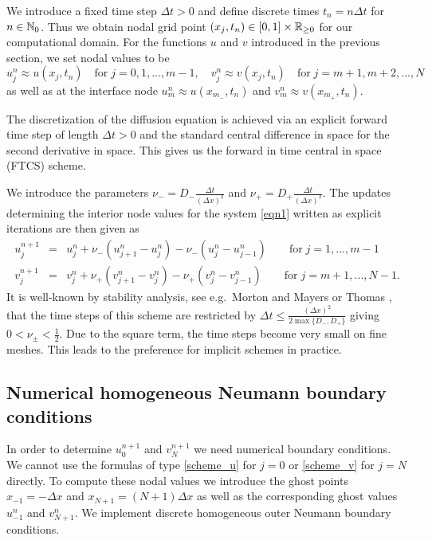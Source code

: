 We introduce a fixed time step $\Delta t>0$ and define discrete times $t_n=n\Delta t$ for $n\in\mathbb{N}_0$.
Thus we obtain nodal grid point $(x_j,t_n)\in [0,1]\times\mathbb{R}_{\ge 0}$ for our computational domain.
For the functions $u$ and $v$ introduced in the previous section, we set nodal values to be
% 
$$%
u_{j}^n \approx u(x_{j},t_n)\quad \text{for}\; j=0,1,...,m-1,
\quad v_{j}^n\approx v(x_{j},t_n) \quad\text{for}\;j=m+1,m+2,...,N
$$%
%
as well as at the interface node $u_{m}^n\approx u(x_{m_{-}},t_n)$ and 
$v_{m}^n\approx v(x_{m_{+}},t_n)$. 

The discretization of the diffusion equation is achieved via an explicit forward time step of length $\Delta t>0$ and 
the standard central difference in space for the second derivative in space. This gives us the forward in time central in space
(FTCS) scheme. 

We introduce the parameters $\nu_-=D_{-}\frac{\Delta t}{(\Delta x)^2}$ and $\nu_+=D_{+}\frac{\Delta t}{(\Delta x)^2}$.
The updates determining the interior node values for the system \eqref{eqn1} written as explicit iterations
are then given as
%
\begin{eqnarray}
\label{scheme_u}
u^{n+1}_{j}&=&u_j^n +\nu_- (u^n_{j+1}-u_{j}^{n})-\nu_-(u_j^n- u_{j-1}^{n}) \qquad\mbox{for}\;j=1,...,m-1\\
\label{scheme_v}
v^{n+1}_{j}&=&v_j^n +\nu_+ (v^n_{j+1}-v_{j}^{n}) -\nu_+ (v_j^n-v_{j-1}^{n}) \qquad\mbox{for}\;j=m+1,...,N-1.
\end{eqnarray}
%
It is well-known by 
stability analysis, see e.g.\ Morton and Mayers \cite{bMOMA} or Thomas \cite{bTHO}, 
that the time steps of this scheme are restricted by 
$\Delta t\le \frac{(\Delta x)^2}{2 \max\{D_{-},D_{+}\}}$ giving $0<\nu_\pm< \frac 12$.
Due to the square term, the time steps become very small on fine meshes. This leads to the preference for implicit schemes in practice.

%
%
\subsection{Numerical homogeneous Neumann boundary conditions}
%
%

In order to determine $u_0^{n+1}$ and $v_N^{n+1}$ we need numerical boundary conditions. We cannot use the
formulas of type \eqref{scheme_u} for $j=0$ or \eqref{scheme_v} for $j=N$ directly. 
To compute these nodal values we introduce the ghost points $x_{-1} =-\Delta x$ and $x_{N+1} =(N+1)\Delta x$ as well as 
the corresponding ghost values $u_{-1}^n$ and $v_{N+1}^n$.
We implement discrete homogeneous outer Neumann boundary conditions. 

